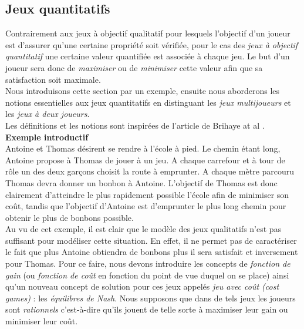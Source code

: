 
\subsection{Jeux quantitatifs }

Contrairement aux jeux à objectif qualitatif pour lesquels l'objectif d'un joueur est d'assurer qu'une certaine propriété soit vérifiée, pour le cas des \textit{jeux à objectif quantitatif} une certaine valeur quantifiée est associée à chaque jeu. Le but d'un joueur sera donc de \textit{maximiser} ou de \textit{minimiser} cette valeur afin que sa satisfaction soit maximale.\\

Nous introduisons cette section par un exemple, ensuite nous aborderons les notions essentielles aux jeux quantitatifs en distinguant les \textit{jeux multijoueurs} et les \textit{jeux à deux joueurs}.\\
Les définitions et les notions sont inspirées de l'article de Brihaye at al \cite{DBLP:conf/lfcs/BrihayePS13}.\\

\noindent\textbf {Exemple introductif} \\
\indent Antoine et Thomas désirent se rendre à l'école à pied. Le chemin étant long, Antoine propose à Thomas de jouer à un jeu. A chaque carrefour et à tour de rôle un des deux garçons choisit la route à emprunter. A chaque mètre parcouru Thomas devra donner un bonbon à Antoine. L'objectif de Thomas est donc clairement d'atteindre le plus rapidement possible l'école afin de minimiser son coût, tandis que l'objectif d'Antoine est d'emprunter le plus long chemin pour obtenir le plus de bonbons possible.\\

Au vu de cet exemple, il est clair que le modèle des jeux qualitatifs n'est pas suffisant pour modéliser cette situation. En effet, il ne permet pas de caractériser le fait que plus Antoine obtiendra de bonbons plus il sera satisfait et inversement pour Thomas. Pour ce faire, nous devons introduire les concepts de \textit{fonction de gain} (ou \textit{fonction de coût} en fonction du point de vue duquel on se place) ainsi qu'un nouveau concept de solution pour ces jeux appelés \textit{jeu avec coût (cost games)} : les \textit{équilibres de Nash}. Nous supposons que dans de tels jeux les joueurs sont \textit{rationnels} c'est-à-dire qu'ils jouent de telle sorte à maximiser leur gain ou minimiser leur coût.\\


